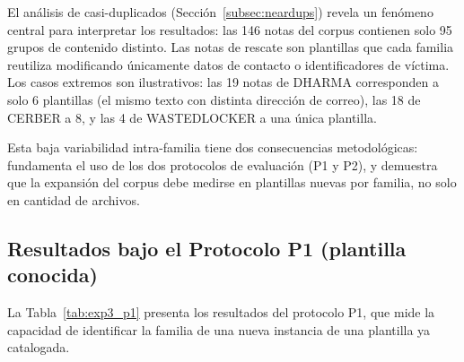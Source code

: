 El análisis de casi-duplicados (Sección~\ref{subsec:neardups}) revela un fenómeno central para interpretar los resultados: las 146 notas del corpus contienen solo 95 grupos de contenido distinto. Las notas de rescate son plantillas que cada familia reutiliza modificando únicamente datos de contacto o identificadores de víctima. Los casos extremos son ilustrativos: las 19 notas de DHARMA corresponden a solo 6 plantillas (el mismo texto con distinta dirección de correo), las 18 de CERBER a 8, y las 4 de WASTEDLOCKER a una única plantilla.

Esta baja variabilidad intra-familia tiene dos consecuencias metodológicas: fundamenta el uso de los dos protocolos de evaluación (P1 y P2), y demuestra que la expansión del corpus debe medirse en plantillas nuevas por familia, no solo en cantidad de archivos.

\subsection{Resultados bajo el Protocolo P1 (plantilla conocida)}

La Tabla~\ref{tab:exp3_p1} presenta los resultados del protocolo P1, que mide la capacidad de identificar la familia de una nueva instancia de una plantilla ya catalogada.

\begin{table}[ht]
\centering
\caption{Clasificación NLP bajo el protocolo P1 (146 notas, 30 familias, 2-fold CV $\times$ 10 semillas)}
\label{tab:exp3_p1}
\end{table}

